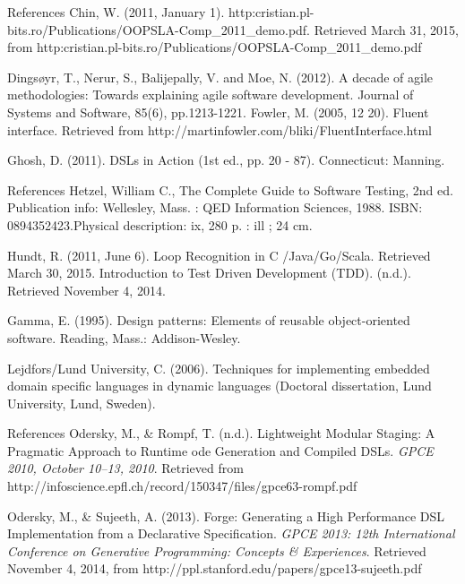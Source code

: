 \begin{thebibliography}{9}

\begin{frame}{References}
 Chin, W. (2011, January 1). http:\/\/cristian.pl-bits.ro/Publications/OOPSLA-Comp\_2011\_demo.pdf. Retrieved March 31, 2015, from http:\/\/cristian.pl-bits.ro/Publications/OOPSLA-Comp\_2011\_demo.pdf

 Dingsøyr, T., Nerur, S., Balijepally, V. and Moe, N. (2012). A decade of agile methodologies: Towards explaining agile software development. Journal of Systems and Software, 85(6), pp.1213-1221.
 Fowler, M. (2005, 12 20). Fluent interface. 
Retrieved from http://martinfowler.com/bliki/FluentInterface.html

Ghosh, D. (2011). DSLs in Action (1st ed., pp. 20 - 87). Connecticut: Manning.
\end{frame}

\begin{frame}{References}
 Hetzel, William C., The Complete Guide to Software Testing, 2nd ed. Publication info: Wellesley, Mass. : QED Information Sciences, 1988. ISBN: 0894352423.Physical description: ix, 280 p. : ill ; 24 cm.

 Hundt, R. (2011, June 6). Loop Recognition in C /Java/Go/Scala. Retrieved March 30, 2015.
 Introduction to Test Driven Development (TDD). (n.d.). Retrieved November 4, 2014.

 Gamma, E. (1995). Design patterns: Elements of reusable object-oriented software. Reading, Mass.: Addison-Wesley.

 Lejdfors/Lund University, C. (2006). Techniques for implementing embedded domain specific languages in dynamic languages (Doctoral dissertation, Lund University, Lund, Sweden).
\end{frame}

\begin{frame}{References}
 Odersky, M., \& Rompf, T. (n.d.). Lightweight Modular Staging: 
A Pragmatic Approach to Runtime ode Generation and Compiled DSLs. \textit{GPCE 2010, October 10–13, 2010}. Retrieved from http://infoscience.epfl.ch/record/150347/files/gpce63-rompf.pdf

 Odersky, M., \& Sujeeth, A. (2013). Forge: Generating a 
High Performance DSL Implementation from a Declarative Speciﬁcation. \textit{GPCE 2013: 12th International Conference on Generative Programming: Concepts \& Experiences}. Retrieved November 4, 2014, from http://ppl.stanford.edu/papers/gpce13-sujeeth.pdf


\end{frame}
\end{thebibliography}
